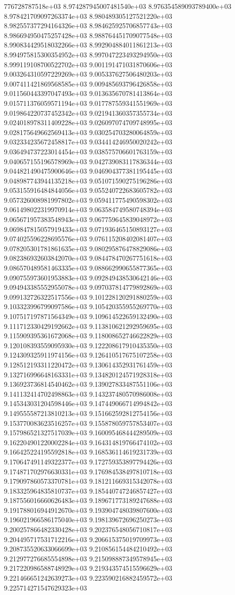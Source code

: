 776728787518e+03	8.974287945007481540e+03	8.976354589093789400e+03	8.978421709097263374e+03	8.980489305127521220e+03	8.982557377294164326e+03	8.984625925706857743e+03	8.986694950475257428e+03	8.988764451709077548e+03	8.990834429518032266e+03	8.992904884011861213e+03	8.994975815300354952e+03	8.997047223493294950e+03	8.999119108700522702e+03	9.001191471031870606e+03	9.003264310597229269e+03	9.005337627506480203e+03	9.007411421869568585e+03	9.009485693796426858e+03	9.011560443397047493e+03	9.013635670781413864e+03	9.015711376059571194e+03	9.017787559341551969e+03	9.019864220737452342e+03	9.021941360357355734e+03	9.024018978311409228e+03	9.026097074709748995e+03	9.028175649662569413e+03	9.030254703280064859e+03	9.032334235672458817e+03	9.034414246950020242e+03	9.036494737223014454e+03	9.038575706601763159e+03	9.040657155196578969e+03	9.042739083117836344e+03	9.044821490475900646e+03	9.046904377381195445e+03	9.048987743944135218e+03	9.051071590275196286e+03	9.053155916484844056e+03	9.055240722683605782e+03	9.057326008981997802e+03	9.059411775490598302e+03	9.061498022319970914e+03	9.063584749580748394e+03	9.065671957383548943e+03	9.067759645839048972e+03	9.069847815057919433e+03	9.071936465150893127e+03	9.074025596228695576e+03	9.076115208402081407e+03	9.078205301781861635e+03	9.080295876478829086e+03	9.082386932603842070e+03	9.084478470267751618e+03	9.086570489581463335e+03	9.088662990655877365e+03	9.090755973601953883e+03	9.092849438530642146e+03	9.094943385552955078e+03	9.097037814779892869e+03	9.099132726322517556e+03	9.101228120291880259e+03	9.103323996799097586e+03	9.105420355955269770e+03	9.107517197871564349e+03	9.109614522659132490e+03	9.111712330429192662e+03	9.113810621292959695e+03	9.115909395361672068e+03	9.118008652746622829e+03	9.120108393559095930e+03	9.122208617910435350e+03	9.124309325911974156e+03	9.126410517675107258e+03	9.128512193311220472e+03	9.130614352931761459e+03	9.132716996648163331e+03	9.134820124571928318e+03	9.136923736814540462e+03	9.139027833487551106e+03	9.141132414702498863e+03	9.143237480570986008e+03	9.145343031204598446e+03	9.147449066714994842e+03	9.149555587213810213e+03	9.151662592812754156e+03	9.153770083623516257e+03	9.155878059757853407e+03	9.157986521327517039e+03	9.160095468444289509e+03	9.162204901220002284e+03	9.164314819766474102e+03	9.166425224195592818e+03	9.168536114619231739e+03	9.170647491149322377e+03	9.172759353897794426e+03	9.174871702976630331e+03	9.176984538497810718e+03	9.179097860573370781e+03	9.181211669315342078e+03	9.183325964835810737e+03	9.185440747246857427e+03	9.187556016660626483e+03	9.189671773189247688e+03	9.191788016944912670e+03	9.193904748039807600e+03	9.196021966586175040e+03	9.198139672696250273e+03	9.200257866482330428e+03	9.202376548056710817e+03	9.204495717531712216e+03	9.206615375019709973e+03	9.208735520633066699e+03	9.210856154484210492e+03	9.212977276685554898e+03	9.215098887349578945e+03	9.217220986588748929e+03	9.219343574515596629e+03	9.221466651242639273e+03	9.223590216882459572e+03	9.225714271547629323e+03
